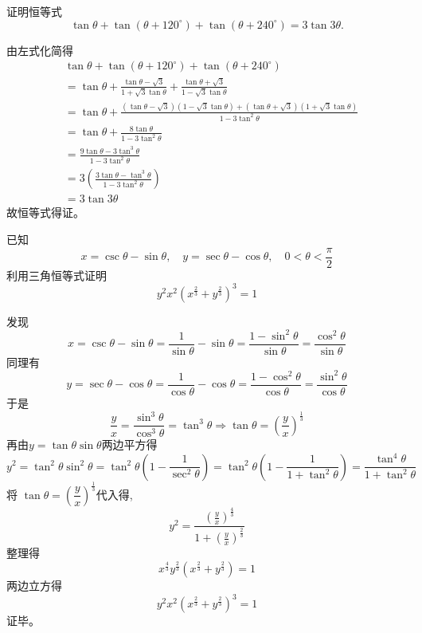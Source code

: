 \begin{questions}
    \question 证明恒等式
    \[
    \tan \theta + \tan(\theta + 120^\circ) + \tan(\theta + 240^\circ) = 3 \tan 3\theta.
    \]
    \begin{solution}
        由左式化简得
        \begin{align*}
        &\tan \theta + \tan(\theta + 120^\circ) + \tan(\theta + 240^\circ) \\
        &= \tan \theta + \frac{\tan \theta - \sqrt{3}}{1 + \sqrt{3} \tan \theta} + \frac{\tan \theta + \sqrt{3}}{1 - \sqrt{3} \tan \theta} \\
        &= \tan \theta + \frac{(\tan \theta - \sqrt{3})(1 - \sqrt{3} \tan \theta) + (\tan \theta + \sqrt{3})(1 + \sqrt{3} \tan \theta)}{1 - 3 \tan^2 \theta} \\
        &= \tan \theta + \frac{8 \tan \theta}{1 - 3 \tan^2 \theta} \\
        &= \frac{9 \tan \theta - 3 \tan^3 \theta}{1 - 3 \tan^2 \theta} \\
        &= 3 \left( \frac{3 \tan \theta - \tan^3 \theta}{1 - 3 \tan^2 \theta} \right) \\
        &= 3 \tan 3\theta
        \end{align*}
        故恒等式得证。
    \end{solution}

    \question 已知
    \[
    x=\csc\theta-\sin\theta,\quad y=\sec\theta-\cos\theta,\quad 0<\theta<\frac{\pi}{2}
    \]
    利用三角恒等式证明
    \[
    y^2x^2\left(x^{\frac{2}{3}}+y^{\frac{2}{3}}\right)^3=1
    \]
    \begin{solution}
        发现
        \[
        x=\csc\theta-\sin\theta=\frac{1}{\sin\theta}-\sin\theta=
        \frac{1-\sin^2\theta}{\sin\theta}
        =\frac{\cos^2\theta}{\sin\theta}
        \]
        同理有
        \[
        y=\sec\theta-\cos\theta=\frac{1}{\cos\theta}-\cos\theta
        =\frac{1-\cos^2\theta}{\cos\theta}
        =\frac{\sin^2\theta}{\cos\theta}
        \]
        于是
        \[
        \frac{y}{x}
        =\frac{\sin^3\theta}{\cos^3\theta}
        =\tan^3\theta \Rightarrow \tan\theta=\left(\frac{y}{x}\right)^{\frac{1}{3}}
        \]
        再由$y=\tan\theta\sin\theta$两边平方得
        \[
        y^2=\tan^2\theta\sin^2\theta
        =\tan^2\theta\left(1-\frac{1}{\sec^2\theta}\right)
        =\tan^2\theta\left(1-\frac{1}{1+\tan^2\theta}\right)
        =\frac{\tan^4\theta}{1+\tan^2\theta}
        \]
        将 $\tan\theta=\left(\dfrac{y}{x}\right)^{\frac{1}{3}}$代入得,
        \[
        y^2=\frac{\left(\frac{y}{x}\right)^{\frac{4}{3}}}{1+\left(\frac{y}{x}\right)^{\frac{2}{3}}}
        \]
        整理得
        \[
        x^{\frac{4}{3}}y^{\frac{2}{3}}(x^{\frac{2}{3}}+y^{\frac{2}{3}})=1
        \]
        两边立方得
        \[
        y^2x^2\left(x^{\frac{2}{3}}+y^{\frac{2}{3}}\right)^3=1
        \]
        证毕。
    \end{solution}


\end{questions}
